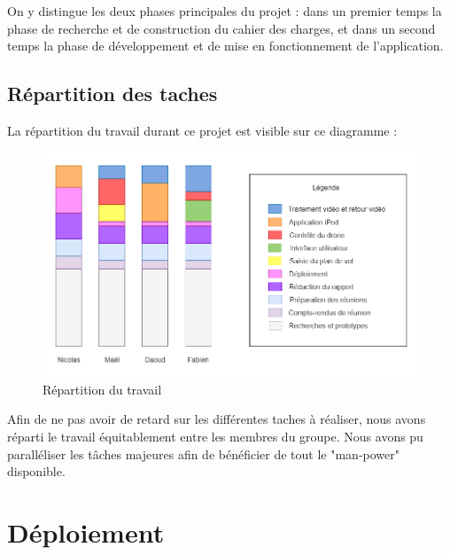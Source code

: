 \documentclass{article}
\begin{document}
    On y distingue les deux phases principales du projet : dans un premier temps la phase de recherche et de construction du cahier des charges, et dans un second temps la phase de développement et de mise en fonctionnement de l'application.
    
	\subsection{Répartition des taches}
	La répartition du travail durant ce projet est visible sur ce diagramme :
	
    \begin{center}
	\begin{figure}[!h]
	\includegraphics[scale=0.35]{repartition_taches.png}
	\caption{Répartition du travail}
	\end{figure}
    \end{center}
    
	Afin de ne pas avoir de retard sur les différentes taches à réaliser, nous avons réparti le travail équitablement entre les membres du groupe. Nous avons pu paralléliser les tâches majeures afin de bénéficier de tout le "man-power" disponible.\\
	
\section{Déploiement}
\end{document}
